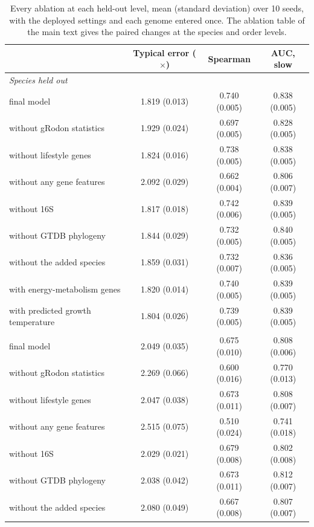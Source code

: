 \begin{table}[ht]\centering\small
\caption{Every ablation at each held-out level, mean (standard deviation) over 10 seeds, with the deployed settings and each genome entered once. The ablation table of the main text gives the paired changes at the species and order levels.}\label{tab:ablationsfull}
\begin{tabular}{lccc}
\toprule
& Typical error ($\times$) & Spearman & AUC, slow \\
\midrule
\multicolumn{4}{l}{\textit{Species held out}} \\
\quad final model & 1.819 (0.013) & 0.740 (0.005) & 0.838 (0.005) \\
\quad without gRodon statistics & 1.929 (0.024) & 0.697 (0.005) & 0.828 (0.005) \\
\quad without lifestyle genes & 1.824 (0.016) & 0.738 (0.005) & 0.838 (0.005) \\
\quad without any gene features & 2.092 (0.029) & 0.662 (0.004) & 0.806 (0.007) \\
\quad without 16S & 1.817 (0.018) & 0.742 (0.006) & 0.839 (0.005) \\
\quad without GTDB phylogeny & 1.844 (0.029) & 0.732 (0.005) & 0.840 (0.005) \\
\quad without the added species & 1.859 (0.031) & 0.732 (0.007) & 0.836 (0.005) \\
\quad with energy-metabolism genes & 1.820 (0.014) & 0.740 (0.005) & 0.839 (0.005) \\
\quad with predicted growth temperature & 1.804 (0.026) & 0.739 (0.005) & 0.839 (0.005) \\
\addlinespace
\multicolumn{4}{l}{\textit{Family held out}} \\
\quad final model & 2.049 (0.035) & 0.675 (0.010) & 0.808 (0.006) \\
\quad without gRodon statistics & 2.269 (0.066) & 0.600 (0.016) & 0.770 (0.013) \\
\quad without lifestyle genes & 2.047 (0.038) & 0.673 (0.011) & 0.808 (0.007) \\
\quad without any gene features & 2.515 (0.075) & 0.510 (0.024) & 0.741 (0.018) \\
\quad without 16S & 2.029 (0.021) & 0.679 (0.008) & 0.802 (0.008) \\
\quad without GTDB phylogeny & 2.038 (0.042) & 0.673 (0.011) & 0.812 (0.007) \\
\quad without the added species & 2.080 (0.049) & 0.667 (0.008) & 0.807 (0.007) \\

\end{tabular}
\end{table}
